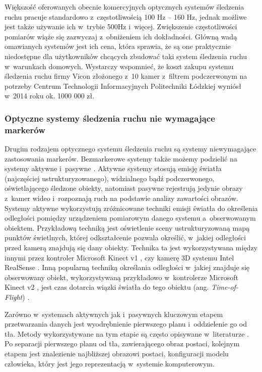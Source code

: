 Większość oferowanych obecnie komercyjnych optycznych systemów śledzenia ruchu pracuje standardowo z~częstotliwością 100 Hz -- 160 Hz, jednak możliwe jest także używanie ich w~trybie 500Hz i~więcej. Zwiększenie częstotliwości pomiarów wiąże się zazwyczaj z~obniżeniem ich dokładności.
Główną wadą omawianych systemów jest ich cena, która sprawia, że są one praktycznie niedostępne dla użytkowników chcących zbudować taki system śledzenia ruchu w~warunkach domowych. Wystarczy wspomnieć, że koszt zakupu systemu śledzenia ruchu firmy Vicon złożonego z~10 kamer z~filtrem podczerwonym na potrzeby Centrum Technologii Informacyjnych Politechniki Łódzkiej  wyniósł w~2014 roku ok. 1000 000 zł.
 
\subsubsection*{Optyczne systemy śledzenia ruchu nie wymagające markerów}\label{chap:mocaps:Kinect}
Drugim rodzajem optycznego systemu śledzenia ruchu są systemy niewymagające zastosowania markerów. Bezmarkerowe systemy także możemy podzielić na systemy aktywne i~pasywne \cite{Mundermann2006}. Aktywne systemy stosują emisję światła (najczęściej ustrukturyzowanego), widzialnego bądź podczerwonego, oświetlającego śledzone obiekty, natomiast pasywne rejestrują jedynie obrazy z~kamer wideo i~rozpoznają ruch na podstawie analizy zawartości obrazów. \\
Systemy aktywne wykorzystują zróżnicowane techniki emisji światła do określenia odległości pomiędzy urządzeniem pomiarowym danego systemu a~obserwowanym obiektem. Przykładową techniką jest oświetlenie sceny ustrukturyzowaną mapą punktów świetlnych, której odkształcenie pozwala określić, w~jakiej odległości przed kamerą znajdują się dany obiekty. Technika ta jest wykorzystywana między innymi przez kontroler Microsoft Kinect v1 \cite{flatley2011}, czy kamerę 3D systemu Intel RealSense \cite{intelRealSenseWebsite}. Inną popularną techniką określania odległości w~jakiej znajduje się obserwowany obiekt, wykorzystywaną przykładowo w~kontrolerze Microsoft Kinect v2 \cite{kinect2Spec}, jest czas dotarcia wiązki światła do tego obiektu (ang. \emph{Time-of-Flight}) \cite{Hansard2013}.

Zarówno w~systemach aktywnych jak i~pasywnych kluczowym etapem przetwarzania danych jest wyodrębnienie pierwszego planu i~oddzielenie go od tła. Metody wykorzystywane na tym etapie są często opisywane w~literaturze \cite{wang2003recent}\cite{rosenhahn2008markerless}\cite{guan2009estimating}\cite{surer2011markerless}\cite{corazza2006markerless}. Po separacji pierwszego planu od tła, zawierającego obraz postaci, kolejnym etapem jest znalezienie najbliższej obrazowi postaci, konfiguracji modelu człowieka, który jest jego reprezentacją w~systemie komputerowym.\\ 

